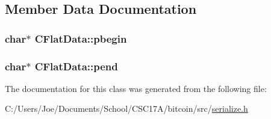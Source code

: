 \subsection{Member Data Documentation}
\hypertarget{class_c_flat_data_ad5f93a9d4e1cc71eb5fc94e9c9d4d89d}{}
\subsubsection[{pbegin}]{\setlength{\rightskip}{0pt plus 5cm}char$\ast$ C\+Flat\+Data\+::pbegin\hspace{0.3cm}{\ttfamily [protected]}}\label{class_c_flat_data_ad5f93a9d4e1cc71eb5fc94e9c9d4d89d}
\hypertarget{class_c_flat_data_add53aa6440254a30392bcf660f3f8057}{}
\subsubsection[{pend}]{\setlength{\rightskip}{0pt plus 5cm}char$\ast$ C\+Flat\+Data\+::pend\hspace{0.3cm}{\ttfamily [protected]}}\label{class_c_flat_data_add53aa6440254a30392bcf660f3f8057}


The documentation for this class was generated from the following file\+:\begin{DoxyCompactItemize}
\item 
C\+:/\+Users/\+Joe/\+Documents/\+School/\+C\+S\+C17\+A/bitcoin/src/\hyperlink{serialize_8h}{serialize.\+h}\end{DoxyCompactItemize}
